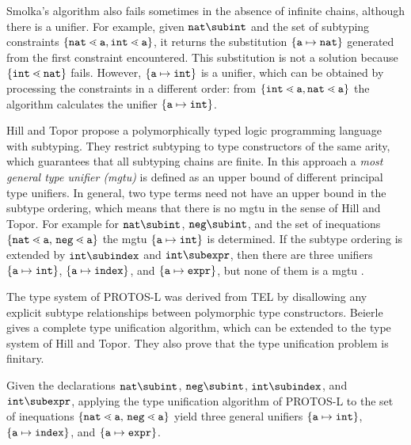 Smolka's algorithm also fails sometimes in the absence of infinite
chains, although there is a unifier. 
For example, given $\texttt{nat} \sub \texttt{int}$ and the set
of subtyping constraints $\{ \mathtt{nat} \lessdot \mathtt{a},
  \mathtt{int} \lessdot \mathtt{a} \}$, it returns the substitution
$\{ \mathtt{a} \mapsto \mathtt{nat} \}$ generated from the first
constraint encountered. This substitution is not a solution
because $\{ \mathtt{int} \lessdot \mathtt{nat} \}$ fails.
However, $\{ \mathtt{a}\mapsto \mathtt{int} \}$ is a unifier, which
can be obtained by processing the constraints in a different order: from $\{ \mathtt{int} \lessdot \mathtt{a}, \mathtt{nat} \lessdot
  \mathtt{a} \}$ the algorithm calculates the unifier 
$\{ \mathtt{a}\mapsto \mathtt{int} \}$.

Hill and Topor  \cite{HiTo92} propose a polymorphically typed logic
programming language with subtyping. They restrict subtyping to type
constructors of the same arity,  which guarantees that all subtyping
chains are finite.
In this approach a \emph{most general type unifier (mgtu)} is
defined as an upper bound of different principal type unifiers. In
general, two type terms need not have an upper bound in the subtype ordering,
which means that there is no mgtu in the sense of Hill and Topor.
For example for  $\texttt{nat} \sub \texttt{int}$, $\texttt{neg} 
\sub \texttt{int}$, and the set of inequations $\set{\mathtt{nat} \lessdot
  \mathtt{a}$, $\mathtt{neg} \lessdot \mathtt{a}}$ the mgtu $\{ \mathtt{a} \mapsto \texttt{int} \}$ is
determined. If the subtype ordering is extended by $\mathtt{int} \sub
\mathtt{index}$ and $\mathtt{int} \sub \mathtt{expr}$, then there are three
unifiers $\{ \mathtt{a} \mapsto \texttt{int} \}$, $\{ \mathtt{a} \mapsto
  \mathtt{index} \}$, and $\{ \mathtt{a} \mapsto 
\mathtt{expr} \}$, but none of them is a mgtu \cite{HiTo92}.

The type system of \textsf{PROTOS-L} \cite{CB95} was
derived from \textsf{TEL} by disallowing any explicit subtype relationships
between polymorphic type constructors. 
Beierle \cite{CB95} gives a complete type unification algorithm, which can be extended to the
type system of Hill and Topor.
They also prove that the type unification problem is finitary.

Given the declarations  $\texttt{nat} \sub
\texttt{int}$, $\texttt{neg} \sub \texttt{int}$, $\mathtt{int} \sub
\mathtt{index}$, and $\mathtt{int} \sub \mathtt{expr}$, applying the
type unification algorithm of \textsf{PROTOS-L} to the set of
inequations $\set{\mathtt{nat} \lessdot
  \mathtt{a}$, $\mathtt{neg} \lessdot \mathtt{a}}$ yield three general
unifiers $\{ \mathtt{a} \mapsto \texttt{int} \}$, $\{ \mathtt{a} \mapsto
  \mathtt{index} \}$, and $\{ \mathtt{a} \mapsto \mathtt{expr} \}$. 

